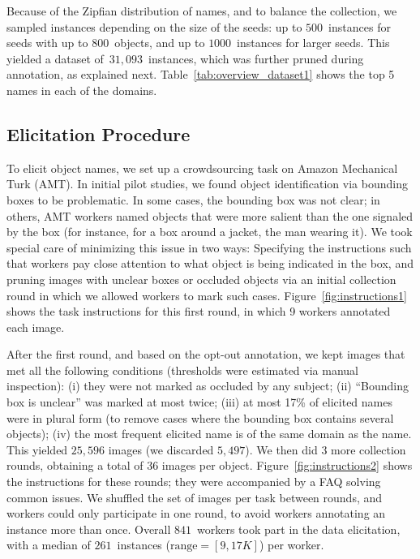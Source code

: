 Because of the Zipfian distribution of names, and to balance the collection, we sampled instances depending on the size of the seeds: up to $500$\ instances for seeds with up to $800$\ objects, and up to $1000$\ instances for larger seeds. This yielded a dataset of\ $31,093$~instances, which was further pruned during annotation, as explained next.
Table~\ref{tab:overview_dataset1} shows the top 5 \vg names in each of the domains.

\subsection{Elicitation Procedure}
\label{ssec:elicitation}

To elicit object names, we set up a crowdsourcing task on Amazon Mechanical Turk (AMT).
In initial pilot studies, we found object identification via bounding boxes to be problematic.
In some cases, the bounding box was not clear; in others, AMT workers named objects that were more salient than the one signaled by the box (for instance, for a box around a jacket, the man wearing it).
We took special care of minimizing this issue in two ways: Specifying the instructions such that workers pay close attention to what object is being indicated in the box, and pruning images with unclear boxes or occluded objects via an initial collection round in which we allowed workers to mark such cases.
Figure~\ref{fig:instructions1} shows the task instructions for this first round, in which 9 workers annotated each image.

After the first round, and based on the opt-out annotation, we kept images that met all the following conditions (thresholds were estimated via manual inspection): (i) they were not marked as occluded by any subject; (ii) ``Bounding box is unclear'' was marked at most twice; (iii) at most 17\% of elicited names were in plural form (to remove cases where the bounding box contains several objects); (iv) the most frequent elicited name is of the same domain as the \vg name.
This yielded $25,596$ images (we discarded $5,497$).
We then did 3 more collection rounds, obtaining a total of 36 images per object.
Figure~\ref{fig:instructions2} shows the instructions for these rounds; they were accompanied by a FAQ solving common issues. 
We shuffled the set of images per task between rounds, and workers could only participate in one round, to avoid workers annotating an instance more than once.
Overall $841$\ workers took part in the data elicitation, with a median of  $261$\ instances \mbox{($\textrm{range}=[9,17K]$)} per worker.


